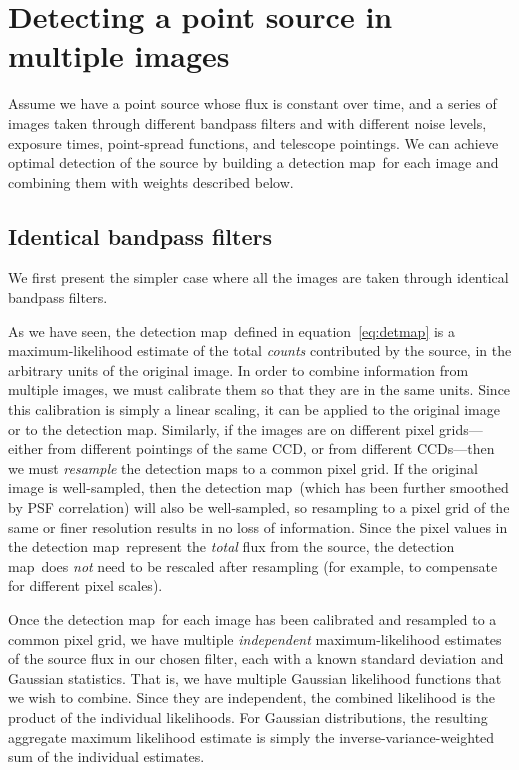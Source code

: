 \documentclass[letterpaper,preprint]{aastex}
\newcommand{\equationname}{equation}
\newcommand{\eqnref}[1]{\mbox{\equationname~\ref{#1}}}
\newcommand{\detmap}{detection map}
\begin{document}
\section{Detecting a point source in multiple images}

Assume we have a point source whose flux is constant over time, and a
series of images taken through different bandpass filters and with
different noise levels, exposure times, point-spread functions, and
telescope pointings.  We can achieve optimal detection of the source
by building a \detmap\ for each image and combining them with weights
described below.


\subsection{Identical bandpass filters}

We first present the simpler case where all the images are taken
through identical bandpass filters.

As we have seen, the \detmap\ defined in \eqnref{eq:detmap} is a
maximum-likelihood estimate of the total \emph{counts} contributed by
the source, in the arbitrary units of the original image.  In order to
combine information from multiple images, we must calibrate them so
that they are in the same units.  Since this calibration is simply a
linear scaling, it can be applied to the original image or to the
\detmap.  Similarly, if the images are on different pixel
grids---either from different pointings of the same CCD, or from
different CCDs---then we must \emph{resample} the \detmap s to a
common pixel grid.
%
If the original image is well-sampled, then the \detmap\ (which has
been further smoothed by PSF correlation) will also be well-sampled,
so resampling to a pixel grid of the same or finer resolution results
in no loss of information.
%
Since the pixel values in the \detmap\ represent the \emph{total} flux
from the source, the \detmap\ does \emph{not} need to be rescaled after
resampling (for example, to compensate for different pixel scales).


Once the \detmap\ for each image has been calibrated and resampled to
a common pixel grid, we have multiple \emph{independent}
maximum-likelihood estimates of the source flux in our chosen filter,
each with a known standard deviation and Gaussian statistics.  That
is, we have multiple Gaussian likelihood functions that we wish to
combine.  Since they are independent, the combined likelihood is the
product of the individual likelihoods.  For Gaussian distributions,
the resulting aggregate maximum likelihood estimate is simply the
inverse-variance-weighted sum of the individual estimates.
\end{document}
